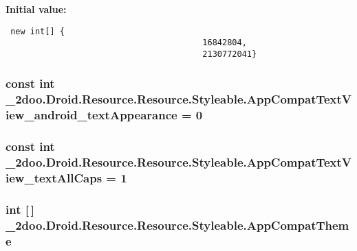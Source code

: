\textbf{Initial value:}

\begin{Code}\begin{verbatim} new int[] {
                                        16842804,
                                        2130772041}
\end{verbatim}
\end{Code}
\hypertarget{class__2doo_1_1_droid_1_1_resource_1_1_styleable_69fc84bb07f5413dcfc3cc68033c90c9}{
\subsubsection[{AppCompatTextView\_\-android\_\-textAppearance}]{\setlength{\rightskip}{0pt plus 5cm}const int \_\-2doo.Droid.Resource.Resource.Styleable.AppCompatTextView\_\-android\_\-textAppearance = 0}}
\label{class__2doo_1_1_droid_1_1_resource_1_1_styleable_69fc84bb07f5413dcfc3cc68033c90c9}


\hypertarget{class__2doo_1_1_droid_1_1_resource_1_1_styleable_01f5aa86548d8d16b26e6d981ea45c47}{
\subsubsection[{AppCompatTextView\_\-textAllCaps}]{\setlength{\rightskip}{0pt plus 5cm}const int \_\-2doo.Droid.Resource.Resource.Styleable.AppCompatTextView\_\-textAllCaps = 1}}
\label{class__2doo_1_1_droid_1_1_resource_1_1_styleable_01f5aa86548d8d16b26e6d981ea45c47}


\hypertarget{class__2doo_1_1_droid_1_1_resource_1_1_styleable_d1d72bbd3073c241726df451c223e8c2}{
\subsubsection[{AppCompatTheme}]{\setlength{\rightskip}{0pt plus 5cm}int \mbox{[}$\,$\mbox{]} \_\-2doo.Droid.Resource.Resource.Styleable.AppCompatTheme}}
\label{class__2doo_1_1_droid_1_1_resource_1_1_styleable_d1d72bbd3073c241726df451c223e8c2}


